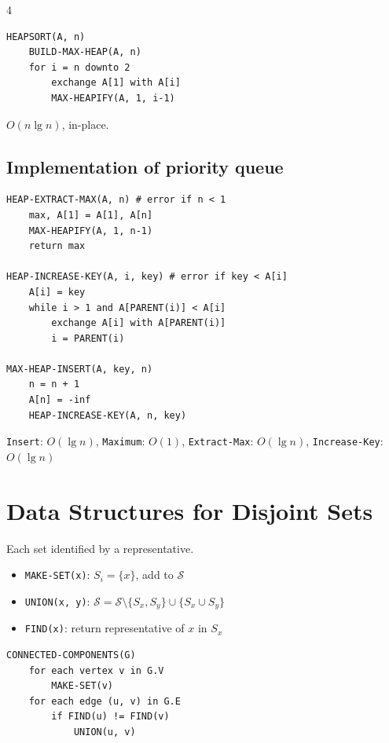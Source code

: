 \documentclass[8pt,a4paper,landscape]{extarticle}
\begin{document}
\begin{multicols*}{4}
\begin{lstlisting}
HEAPSORT(A, n)
    BUILD-MAX-HEAP(A, n)
    for i = n downto 2
        exchange A[1] with A[i]
        MAX-HEAPIFY(A, 1, i-1)
\end{lstlisting}

\begin{prop}[title=Runtime]
$O(n \lg n)$, in-place.
\end{prop}

\subsection{Implementation of priority queue}

\begin{lstlisting}
HEAP-EXTRACT-MAX(A, n) # error if n < 1
    max, A[1] = A[1], A[n]
    MAX-HEAPIFY(A, 1, n-1)
    return max

HEAP-INCREASE-KEY(A, i, key) # error if key < A[i]
    A[i] = key
    while i > 1 and A[PARENT(i)] < A[i]
        exchange A[i] with A[PARENT(i)]
        i = PARENT(i)

MAX-HEAP-INSERT(A, key, n)
    n = n + 1
    A[n] = -inf
    HEAP-INCREASE-KEY(A, n, key)
\end{lstlisting}

\begin{prop}[title=Runtimes]
\texttt{Insert}: $O(\lg n)$, \texttt{Maximum}: $O(1)$, \texttt{Extract-Max}: $O(\lg n)$, \texttt{Increase-Key}: $O(\lg n)$
\end{prop}

\section{Data Structures for Disjoint Sets}
Each set identified by a representative.

\begin{defn}[title=Operations]
\begin{itemize}
  \item \texttt{MAKE-SET(x)}: $S_i = \{x\}$, add to $\mathcal{S}$
  \item \texttt{UNION(x, y)}: $\mathcal{S} = \mathcal{S} \setminus \{S_x, S_y\} \cup \{S_x \cup S_y\}$
  \item \texttt{FIND(x)}: return representative of $x$ in $S_x$
\end{itemize}
\end{defn}

\begin{lstlisting}
CONNECTED-COMPONENTS(G)
    for each vertex v in G.V
        MAKE-SET(v)
    for each edge (u, v) in G.E
        if FIND(u) != FIND(v)
            UNION(u, v)
\end{lstlisting}


\end{multicols*}
\end{document}
